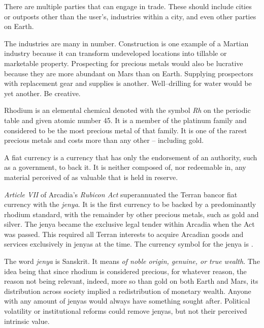There are multiple parties that can engage in trade. These should include cities or outposts other than the user's, industries within a city, and even other parties on Earth.

The industries are many in number. Construction is one example of a Martian industry because it can transform undeveloped locations into tillable or marketable property. Prospecting for precious metals would also be lucrative because they are more abundant on Mars than on Earth. Supplying prospectors with replacement gear and supplies is another. Well--drilling for water would be yet another. Be creative.

Rhodium is an elemental chemical denoted with the symbol {\it Rh} on the periodic table and given atomic number 45. It is a member of the platinum family and considered to be the most precious metal of that family. It is one of the rarest precious metals and costs more than any other -- including gold.

A fiat currency is a currency that has only the endorsement of an authority, such as a government, to back it. It is neither composed of, nor redeemable in, any material perceived of as valuable that is held in reserve.

{\it Article VII} of Arcadia's {\it Rubicon Act} superannuated the Terran bancor fiat currency with the {\it jenya}. It is the first currency to be backed by a predominantly rhodium standard, with the remainder by other precious metals, such as gold and silver. The jenya became the exclusive legal tender within Arcadia when the Act was passed. This required all Terran interests to acquire Arcadian goods and services exclusively in jenyas at the time. The currency symbol for the jenya is .

    {}

The word {\it jenya} is Sanskrit. It means {\it of noble origin, genuine, or true wealth}. The idea being that since rhodium is considered precious, for whatever reason, the reason not being relevant, indeed, more so than gold on both Earth and Mars, its distribution across society implied a redistribution of monetary wealth. Anyone with any amount of jenyas would always have something sought after. Political volatility or institutional reforms could remove jenyas, but not their perceived intrinsic value.

